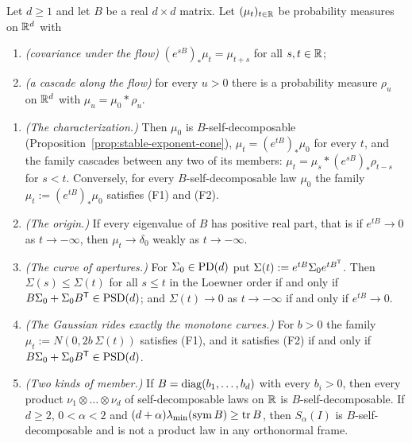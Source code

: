 \begin{proposition}\label{prop:one-parameter-families}
Let $d \ge 1$ and let $B$ be a real $d \times d$ matrix. Let $(\mu_t)_{t\in\mathbb{R}}$ be probability
measures on $\mathbb{R}^d$ with
\begin{enumerate}
\item[(F1)] \emph{(covariance under the flow)} $(e^{sB})_*\mu_t = \mu_{t+s}$ for all $s, t \in \mathbb{R}$;
\item[(F2)] \emph{(a cascade along the flow)} for every $u > 0$ there is a probability measure
$\rho_u$ on $\mathbb{R}^d$ with $\mu_u = \mu_0 * \rho_u$.
\end{enumerate}
\begin{enumerate}
\item \emph{(The characterization.)} Then $\mu_0$ is $B$-self-decomposable
(Proposition~\ref{prop:stable-exponent-cone}), $\mu_t = (e^{tB})_*\mu_0$ for every $t$, and the family cascades
between any two of its members: $\mu_t = \mu_s * (e^{sB})_*\rho_{t-s}$ for $s < t$. Conversely, for
every $B$-self-decomposable law $\mu_0$ the family $\mu_t := (e^{tB})_*\mu_0$ satisfies (F1) and
(F2).
\item \emph{(The origin.)} If every eigenvalue of $B$ has positive real part, that is if
$e^{tB} \to 0$ as $t \to -\infty$, then $\mu_t \to \delta_0$ weakly as $t \to -\infty$.
\item \emph{(The curve of apertures.)} For $\Sigma_0 \in \mathrm{PD}(d)$ put
$\Sigma(t) := e^{tB}\Sigma_0e^{tB^{\mathsf{T}}}$. Then $\Sigma(s) \le \Sigma(t)$ for all $s \le t$ in the
Loewner order if and only if $B\Sigma_0 + \Sigma_0B^{\mathsf{T}} \in \mathrm{PSD}(d)$; and $\Sigma(t) \to 0$ as
$t \to -\infty$ if and only if $e^{tB} \to 0$.
\item \emph{(The Gaussian rides exactly the monotone curves.)} For $b > 0$ the family
$\mu_t := N(0, 2b\,\Sigma(t))$ satisfies (F1), and it satisfies (F2) if and only if
$B\Sigma_0 + \Sigma_0B^{\mathsf{T}} \in \mathrm{PSD}(d)$.
\item \emph{(Two kinds of member.)} If $B = \operatorname{diag}(b_1,\dots,b_d)$ with every $b_i > 0$, then every
product $\nu_1 \otimes \dots \otimes \nu_d$ of self-decomposable laws on $\mathbb{R}$ is
$B$-self-decomposable. If $d \ge 2$, $0 < \alpha < 2$ and
$(d+\alpha)\lambda_{\min}(\mathrm{sym}\,B) \ge \operatorname{tr} B$, then $S_\alpha(I)$ is $B$-self-decomposable
and is not a product law in any orthonormal frame.
\end{enumerate}
\end{proposition}

